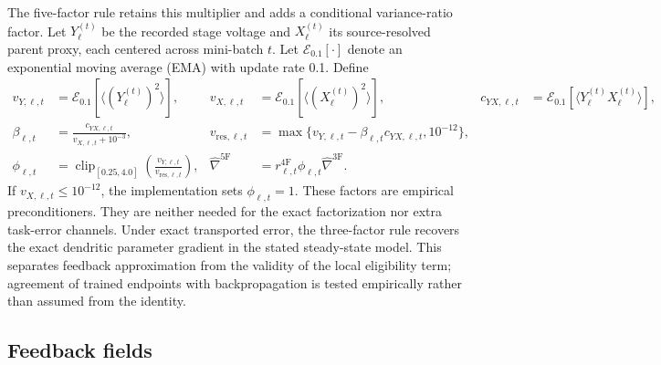 The five-factor rule retains this multiplier and adds a conditional
variance-ratio factor. Let $Y_\ell^{(t)}$ be the recorded stage voltage and
$X_\ell^{(t)}$ its source-resolved parent proxy, each centered across mini-batch
$t$.
Let $\mathcal E_{0.1}[\cdot]$ denote an exponential moving average (EMA)
with update rate 0.1. Define
\begin{align}
v_{Y,\ell,t}&=\mathcal E_{0.1}[\langle (Y_\ell^{(t)})^2\rangle],&
v_{X,\ell,t}&=\mathcal E_{0.1}[\langle (X_\ell^{(t)})^2\rangle],&
c_{YX,\ell,t}&=\mathcal E_{0.1}[\langle Y_\ell^{(t)}X_\ell^{(t)}\rangle],\\
\beta_{\ell,t}&=\frac{c_{YX,\ell,t}}{v_{X,\ell,t}+10^{-3}},&
v_{\mathrm{res},\ell,t}&=\max\{v_{Y,\ell,t}-\beta_{\ell,t}c_{YX,\ell,t},10^{-12}\},\\
\phi_{\ell,t}&=\operatorname{clip}_{[0.25,4.0]}
 \left(\frac{v_{Y,\ell,t}}{v_{\mathrm{res},\ell,t}}\right),&
\widehat\nabla^{\mathrm{5F}}
&=r_{\ell,t}^{\mathrm{4F}}\phi_{\ell,t}\widehat\nabla^{\mathrm{3F}}.
\label{eq:s_5f}
\end{align}
If $v_{X,\ell,t}\leq10^{-12}$, the implementation sets $\phi_{\ell,t}=1$. These factors
are empirical preconditioners. They
are neither needed for the exact factorization nor extra task-error channels.
Under exact transported error, the three-factor rule recovers the exact
dendritic parameter gradient in the stated steady-state model. This separates
feedback approximation from the validity of the local eligibility term;
agreement of trained endpoints with backpropagation is tested empirically
rather than assumed from the identity.

\subsection{Feedback fields}

